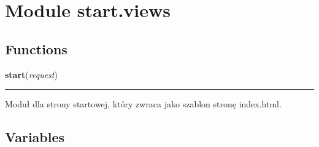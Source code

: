 %
%
%


\section{Module start.views}

    \label{start:views}


  \subsection{Functions}

    \label{start:views:start}

    \vspace{0.5ex}

\hspace{.8\funcindent}\begin{boxedminipage}{\funcwidth}

    \raggedright \textbf{start}(\textit{request})

    \vspace{-1.5ex}

    \rule{\textwidth}{0.5\fboxrule}
\setlength{\parskip}{2ex}
    Moduł dla strony startowej, który zwraca jako szablon stronę 
    index.html.

\setlength{\parskip}{1ex}
    \end{boxedminipage}



  \subsection{Variables}

